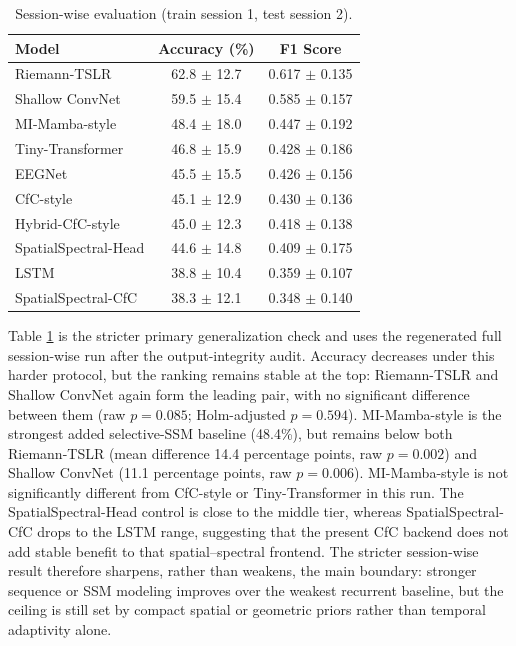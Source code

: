 \documentclass[journal]{IEEEtran}
\begin{document}
\begin{table}[t]
  \centering
  \footnotesize
  \caption{Session-wise evaluation (train session 1, test session 2).}
  \begin{tabular}{lcc}
    \toprule
    \textbf{Model} & \textbf{Accuracy (\%)} & \textbf{F1 Score} \\
    \midrule
    Riemann-TSLR & 62.8 $\pm$ 12.7 & 0.617 $\pm$ 0.135 \\
    Shallow ConvNet & 59.5 $\pm$ 15.4 & 0.585 $\pm$ 0.157 \\
    MI-Mamba-style & 48.4 $\pm$ 18.0 & 0.447 $\pm$ 0.192 \\
    Tiny-Transformer & 46.8 $\pm$ 15.9 & 0.428 $\pm$ 0.186 \\
    EEGNet & 45.5 $\pm$ 15.5 & 0.426 $\pm$ 0.156 \\
    CfC-style & 45.1 $\pm$ 12.9 & 0.430 $\pm$ 0.136 \\
    Hybrid-CfC-style & 45.0 $\pm$ 12.3 & 0.418 $\pm$ 0.138 \\
    SpatialSpectral-Head & 44.6 $\pm$ 14.8 & 0.409 $\pm$ 0.175 \\
    LSTM & 38.8 $\pm$ 10.4 & 0.359 $\pm$ 0.107 \\
    SpatialSpectral-CfC & 38.3 $\pm$ 12.1 & 0.348 $\pm$ 0.140 \\
    \bottomrule
  \end{tabular}
  \label{tab:sessionwise}
\end{table}

Table \ref{tab:sessionwise} is the stricter primary generalization check and uses the regenerated full session-wise run after the output-integrity audit. Accuracy decreases under this harder protocol, but the ranking remains stable at the top: Riemann-TSLR and Shallow ConvNet again form the leading pair, with no significant difference between them (raw $p = 0.085$; Holm-adjusted $p = 0.594$). MI-Mamba-style is the strongest added selective-SSM baseline (48.4\%), but remains below both Riemann-TSLR (mean difference 14.4 percentage points, raw $p = 0.002$) and Shallow ConvNet (11.1 percentage points, raw $p = 0.006$). MI-Mamba-style is not significantly different from CfC-style or Tiny-Transformer in this run. The SpatialSpectral-Head control is close to the middle tier, whereas SpatialSpectral-CfC drops to the LSTM range, suggesting that the present CfC backend does not add stable benefit to that spatial--spectral frontend. The stricter session-wise result therefore sharpens, rather than weakens, the main boundary: stronger sequence or SSM modeling improves over the weakest recurrent baseline, but the ceiling is still set by compact spatial or geometric priors rather than temporal adaptivity alone.
\end{document}

